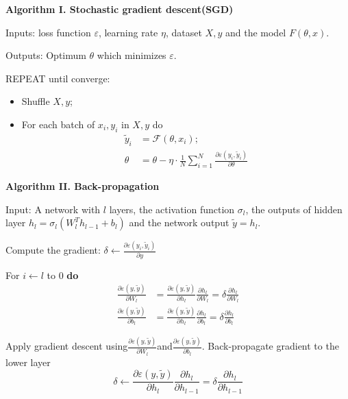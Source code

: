 \documentclass[a4paper]{article}
\begin{document}
\begin{minipage}{\linewidth}
\textbf{Algorithm I. Stochastic gradient descent(SGD)}

Inputs: loss function $\varepsilon$, learning rate $\eta$, dataset $X,y$ and the model $F(\theta,x)$.

Outputs: Optimum $\theta$ which minimizes $\varepsilon$.

REPEAT until converge:
\begin{itemize}
\item Shuffle $X,y$;
\item For each batch of $x_i,y_i$ in $X,y$ do
\begin{align*}
\tilde{y}_{i}&=\mathcal{F}\left(\theta,x_{i}\right);\\
\theta&=\theta-\eta\cdot\frac{1}{N}\sum_{i = 1}^{N}\frac{\partial\varepsilon(y_{i},\tilde{y}_{i})}{\partial\theta}
\end{align*}
\end{itemize}
\end{minipage}


\begin{minipage}{\linewidth}
\textbf{Algorithm II. Back-propagation}

Input: A network with $l$ layers, the activation function $\sigma_l$, the outputs of hidden layer $h_l=\sigma_l(W_l^T h_{l - 1}+b_l)$ and the network output $\tilde{y} = h_l$.

Compute the gradient: $\delta \leftarrow \frac{\partial \varepsilon\left(y_{i}, \tilde{y}_{i}\right)}{\partial y}$

For $i\leftarrow l$ to $0$ \textbf{do}
\begin{align*}
\frac{\partial\varepsilon(y,\tilde{y})}{\partial W_{l}}&=\frac{\partial\varepsilon(y,\tilde{y})}{\partial h_{l}}\frac{\partial h_{l}}{\partial W_{l}}=\delta\frac{\partial h_{l}}{\partial W_{l}}\\
\frac{\partial\varepsilon(y,\tilde{y})}{\partial b_{l}}&=\frac{\partial\varepsilon(y,\tilde{y})}{\partial h_{l}}\frac{\partial h_{l}}{\partial b_{l}}=\delta\frac{\partial h_{l}}{\partial b_{l}}
\end{align*}

Apply gradient descent using$\frac{\partial \varepsilon\left(y, \tilde{y}\right)}{\partial W_{l}}$and$\frac{\partial \varepsilon\left(y, \tilde{y}\right)}{\partial b_{l}}$. 
Back-propagate gradient to the lower layer
\[
\delta\leftarrow\frac{\partial\varepsilon(y,\tilde{y})}{\partial h_{l}}\frac{\partial h_{l}}{\partial h_{l - 1}}=\delta\frac{\partial h_{l}}{\partial h_{l - 1}}
\]

\end{minipage}
\end{document}
